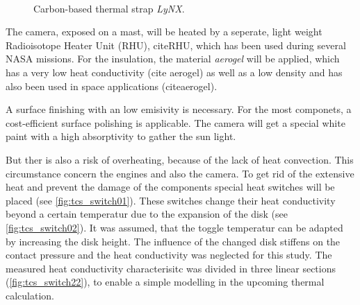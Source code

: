 \begin{figure}[h]
	\centering
	\qquad\qquad
	\caption{Carbon-based thermal strap \textit{LyNX}\textsuperscript{\tiny\textregistered}.}
	\label{fig:tcs_strap01}
\end{figure}


The camera, exposed on a mast, will be heated by a seperate, light weight Radioisotope Heater Unit (RHU), cite{RHU}, which has  been used during several NASA missions. %
For the insulation, the material \textit{aerogel} will be applied, which has a very low heat conductivity (cite aerogel) as well as a low density and has also been used in space applications (cite{aerogel}).

A surface finishing with an low emisivity is necessary.
For the most componets, a cost-efficient surface polishing is applicable.
The camera will get a special white paint with a high absorptivity to gather the  sun light.

But ther is also a risk of overheating, because of the lack of heat convection.
This circumstance concern the engines and also the camera.
To get rid of the extensive heat and prevent the damage of the components special heat switches will be  placed (see \autoref{fig:tcs_switch01}).
These switches change their heat conductivity beyond a certain temperatur due to the expansion of the disk (see \autoref{fig:tcs_switch02}).
It was assumed, that the toggle temperatur can be adapted by increasing the disk height.
The influence of the changed disk stiffens on the contact pressure and the heat conductivity was neglected for this study.
The measured heat conductivity characterisitc was divided in three linear sections (\autoref{fig:tcs_switch22}), to enable a simple modelling in the upcoming thermal calculation.

